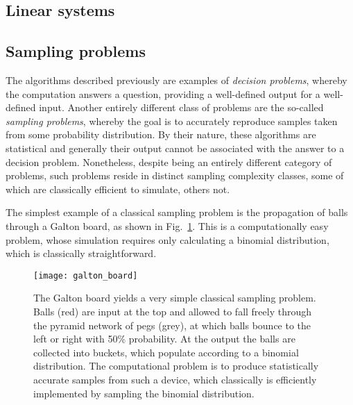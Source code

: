 
%
%

\subsection{Linear systems}\label{sec:linear_systems} 

\cite{bib:harrow2009quantum}



%
%

\subsection{Sampling problems}\label{sec:sampling_problems}

The algorithms described previously are examples of \textit{decision problems}, whereby the computation answers a question, providing a well-defined output for a well-defined input. Another entirely different class of problems are the so-called \textit{sampling problems}, whereby the goal is to accurately reproduce samples taken from some probability distribution. By their nature, these algorithms are statistical and generally their output cannot be associated with the answer to a decision problem. Nonetheless, despite being an entirely different category of problems, such problems reside in distinct sampling complexity classes, some of which are classically efficient to simulate, others not.

The simplest example of a classical sampling problem is the propagation of balls through a Galton board, as shown in Fig.~\ref{fig:galton_board}. This is a computationally easy problem, whose simulation requires only calculating a binomial distribution, which is classically straightforward.

\begin{figure}[!htbp]
\texttt{[image: galton\_board]}
\captionspacefig \caption{The Galton board yields a very simple classical sampling problem. Balls (red) are input at the top and allowed to fall freely through the pyramid network of pegs (grey), at which balls bounce to the left or right with 50\% probability. At the output the balls are collected into buckets, which populate according to a binomial distribution. The computational problem is to produce statistically accurate samples from such a device, which classically is efficiently implemented by sampling the binomial distribution.}	\label{fig:galton_board}
\end{figure}

